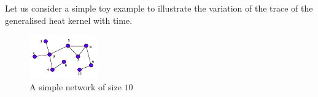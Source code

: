 \documentclass[10pt,a4paper]{article}
\begin{document}
        
        Let us consider a simple toy example to illustrate the variation of the trace of the generalised heat kernel with time.
        \begin{figure}[H]
        	\centering
        	\includegraphics[width= 0.35 \textwidth]{images/diffusion-graph.pdf}
        	\caption{}
        	\label{keneltoymodel2}
        	\caption{A simple network of size $10$}
        	\label{}
        \end{figure}
        
\end{document}
